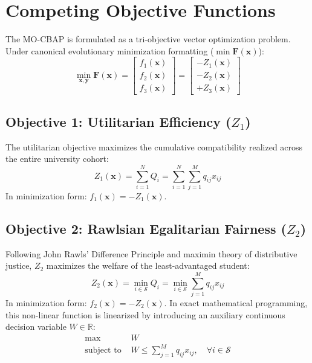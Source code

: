 \section{Competing Objective Functions}
The MO-CBAP is formulated as a tri-objective vector optimization problem. Under canonical evolutionary minimization formatting ($\min \mathbf{F}(\mathbf{x})$):
\begin{equation}
    \min_{\mathbf{x}, \mathbf{y}} \mathbf{F}(\mathbf{x}) = \begin{bmatrix}
        f_1(\mathbf{x}) \\
        f_2(\mathbf{x}) \\
        f_3(\mathbf{x})
    \end{bmatrix} = \begin{bmatrix}
        -Z_1(\mathbf{x}) \\
        -Z_2(\mathbf{x}) \\
        +Z_3(\mathbf{x})
    \end{bmatrix}
    \label{eq:vector_obj}
\end{equation}

\subsection{Objective 1: Utilitarian Efficiency ($Z_1$)}
The utilitarian objective maximizes the cumulative compatibility realized across the entire university cohort:
\begin{equation}
    Z_1(\mathbf{x}) = \sum_{i=1}^N Q_i = \sum_{i=1}^N \sum_{j=1}^M q_{ij} x_{ij}
    \label{eq:z1}
\end{equation}
In minimization form: $f_1(\mathbf{x}) = -Z_1(\mathbf{x})$.

\subsection{Objective 2: Rawlsian Egalitarian Fairness ($Z_2$)}
Following John Rawls' Difference Principle and maximin theory of distributive justice, $Z_2$ maximizes the welfare of the least-advantaged student:
\begin{equation}
    Z_2(\mathbf{x}) = \min_{i \in \mathcal{S}} Q_i = \min_{i \in \mathcal{S}} \sum_{j=1}^M q_{ij} x_{ij}
    \label{eq:z2}
\end{equation}
In minimization form: $f_2(\mathbf{x}) = -Z_2(\mathbf{x})$. In exact mathematical programming, this non-linear function is linearized by introducing an auxiliary continuous decision variable $W \in \mathbb{R}$:
\begin{align}
    \max \; & W \label{eq:milp_rawls} \\
    \text{subject to } & W \le \sum_{j=1}^M q_{ij} x_{ij}, \quad \forall i \in \mathcal{S}
\end{align}

